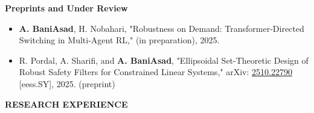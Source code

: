 \documentclass[12pt]{article}
\begin{document}
\noindent
{\bfseries Preprints and Under Review}

\begin{itemize} \itemsep -1pt %
	\item \textbf{A. BaniAsad}, H. Nobahari, "Robustness on Demand: Transformer-Directed Switching in Multi-Agent RL," (in preparation), 2025. 
	\item R. Pordal, A. Sharifi, and \textbf{A. BaniAsad}, "Ellipsoidal Set-Theoretic Design of Robust Safety Filters for Constrained Linear Systems," arXiv: \href{https://arxiv.org/abs/2510.22790}{2510.22790} [eess.SY], 2025. (preprint)
\end{itemize}



 \newpage
\vspace{-4pt}
\begin{center}
	{\noindent \bfseries RESEARCH EXPERIENCE}
\end{center}

\vspace{8pt} %

\noindent
\end{document}
